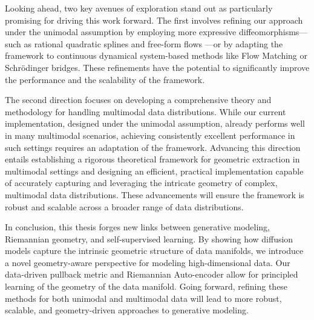 Looking ahead, two key avenues of exploration stand out as particularly promising for driving this work forward. The first involves refining our approach under the unimodal assumption by employing more expressive diffeomorphisms—such as rational quadratic splines \cite{durkan2019neural} and free-form flows \cite{draxler2024free}—or by adapting the framework to continuous dynamical system-based methods like Flow Matching or Schrödinger bridges. These refinements have the potential to significantly improve the performance and the scalability of the framework.

The second direction focuses on developing a comprehensive theory and methodology for handling multimodal data distributions. While our current implementation, designed under the unimodal assumption, already performs well in many multimodal scenarios, achieving consistently excellent performance in such settings requires an adaptation of the framework. Advancing this direction entails establishing a rigorous theoretical framework for geometric extraction in multimodal settings and designing an efficient, practical implementation capable of accurately capturing and leveraging the intricate geometry of complex, multimodal data distributions. These advancements will ensure the framework is robust and scalable across a broader range of data distributions.

In conclusion, this thesis forges new links between generative modeling, Riemannian geometry, and self-supervised learning. By showing how diffusion models capture the intrinsic geometric structure of data manifolds, we introduce a novel geometry-aware perspective for modeling high-dimensional data. Our data-driven pullback metric and Riemannian Auto-encoder allow for principled learning of the geometry of the data manifold. Going forward, refining these methods for both unimodal and multimodal data will lead to more robust, scalable, and geometry-driven approaches to generative modeling.